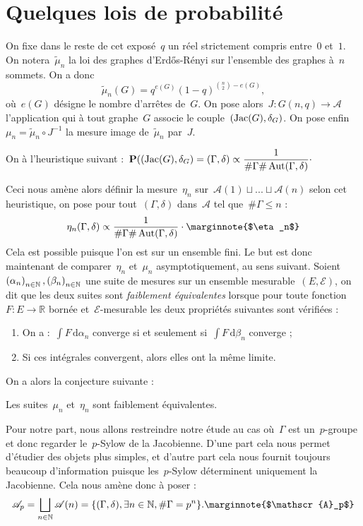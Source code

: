 \section{Quelques lois de probabilité}
	On fixe dans le reste de cet exposé~$q$ un réel strictement compris entre~$0$ et~$1$. On notera~$\tilde{\mu}_n$ la loi des graphes d'Erd\H{o}s-Rényi sur l'ensemble des graphes à~$n$ sommets. On a donc
	\[
		\tilde{\mu}_n(G) = q^{e(G)}(1-q)^{\binom{n}{2}-e(G)},
	\]
	où~$e(G)$ désigne le nombre d'arrêtes de~$G$. On pose alors~$J:G(n,q)\rightarrow \mathscr{A}$ l'application qui à tout graphe~$G$ associe le couple~$(\operatorname{Jac}(G),\delta_G)$. On pose enfin~$\mu_n = \tilde{\mu}_n \circ J^{-1}$ la mesure image de~$\tilde{\mu}_n$ par~$J$.
	\begin{heur}
		On à l'heuristique suivant :~$\displaystyle\bm{\mathrm{P}}((\operatorname{Jac}(G),\delta_G)=(\Gamma,\delta) \propto \frac{1}{\#\Gamma\#\operatorname{Aut}(\Gamma,\delta)}\cdot$
	\end{heur}
	Ceci nous amène alors définir la mesure~$\eta_n$ sur~$\mathscr{A}(1)\sqcup ...\sqcup \mathscr{A}(n)$ selon cet heuristique, on pose pour tout~$(\Gamma,\delta)$ dans~$\mathscr{A}$ tel que~$\#\Gamma \leq n$ :
	\[
		\eta_n(\Gamma,\delta) \propto\frac{1}{\#\Gamma\#\Aut(\Gamma,\delta)}\cdot
		\text{\marginnote{$\eta_n$}}
	\]
	Cela est possible puisque l'on est sur un ensemble fini. Le but est donc maintenant de comparer~$\eta_n$ et~$\mu_n$ asymptotiquement, au sens suivant. Soient~$\suite{\alpha},\suite{\beta}$ une suite de mesures sur un ensemble mesurable~$(E,\mathcal{E})$, on dit que les deux suites sont \emph{faiblement équivalentes} lorsque pour toute fonction~$F : E\rightarrow\mathbb{R}$ bornée et~$\mathcal{E}$-mesurable les deux propriétés suivantes sont vérifiées :
	\begin{enumerate}
		\item On a :~$\int F\,\mathrm{d}\alpha_n$ converge si et seulement si~$\int F\,\mathrm{d}\beta_n$ converge ;
		\item Si ces intégrales convergent, alors elles ont la même limite.
	\end{enumerate}
	 On a alors la conjecture suivante :
	\begin{conj}
		Les suites~$\mu_n$ et~$\eta_n$ sont faiblement équivalentes.
	\end{conj}
	Pour notre part, nous allons restreindre notre étude au cas où~$\Gamma$ est un~$p$-groupe et donc regarder le~$p$-Sylow de la Jacobienne. D'une part cela nous permet d'étudier des objets plus simples, et d'autre part cela nous fournit toujours beaucoup d'information puisque les~$p$-Sylow déterminent uniquement la Jacobienne. Cela nous amène donc à poser :
	\[
		\mathscr{A}_p = \bigsqcup_{n\in\mathbb{N}} \mathscr{A}(n)
			= \{(\Gamma,\delta), \exists n\in\mathbb{N},\#\Gamma = p^n\}.
			\text{\marginnote{$\mathscr{A}_p$}}
	\]
	